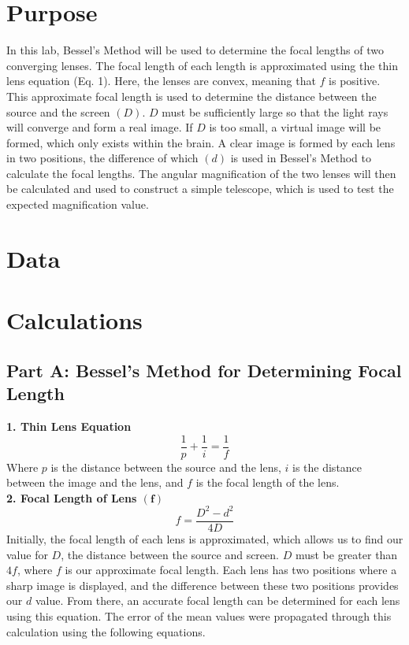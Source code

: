 \documentclass[12pt]{article}
\begin{document}

\newpage
\tableofcontents
\newpage
\section{Purpose}
In this lab, Bessel's Method will be used to determine the focal lengths of two converging lenses. 
The focal length of each length is approximated using the thin lens equation (Eq. 1). 
Here, the lenses are convex, meaning that $f$ is positive.
This approximate focal length is used to determine the distance between the source and the screen $(D)$. 
$D$ must be sufficiently large so that the light rays will converge and form a real image. 
If $D$ is too small, a virtual image will be formed, which only exists within the brain.
A clear image is formed by each lens in two positions, the difference of which $(d)$ is used in Bessel's Method to calculate the focal lengths.
The angular magnification of the two lenses will then be calculated and used to construct a simple telescope, which is used to test the expected magnification value.  
\newpage
\section{Data}

\newpage
\section{Calculations}
\subsection*{Part A: Bessel's Method for Determining Focal Length}
\noindent \textbf{1. Thin Lens Equation}\[\frac{1}{p}+\frac{1}{i}=\frac{1}{f}\]
    Where $p$ is the distance between the source and the lens, $i$ is the distance between the image and the lens, and $f$ is the focal length of the lens. \\
\textbf{2. Focal Length of Lens $\bm{({f})}$}\[f=\frac{D^2-d^2}{4D}\]
    Initially, the focal length of each lens is approximated, which allows us to find our value for $D$, the distance between the source and screen. $D$ must be greater than $4f$, where $f$ is our approximate focal length. Each lens has two positions where a sharp image is displayed, and the difference between these two positions provides our $d$ value. From there, an accurate focal length can be determined for each lens using this equation.
    The error of the mean values were propagated through this calculation using the following equations.
\end{document}
